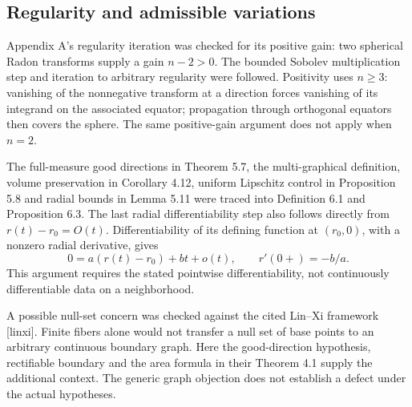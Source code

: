 \documentclass[10pt]{article}
\begin{document}
\subsection*{Regularity and admissible variations}
Appendix A’s regularity iteration was checked for its positive gain: two spherical Radon transforms supply a gain \(n-2>0\). The bounded Sobolev multiplication step and iteration to arbitrary regularity were followed. Positivity uses \(n\geq3\): vanishing of the nonnegative transform at a direction forces vanishing of its integrand on the associated equator; propagation through orthogonal equators then covers the sphere. The same positive-gain argument does not apply when \(n=2\).\par
The full-measure good directions in Theorem 5.7, the multi-graphical definition, volume preservation in Corollary 4.12, uniform Lipschitz control in Proposition 5.8 and radial bounds in Lemma 5.11 were traced into Definition 6.1 and Proposition 6.3. The last radial differentiability step also follows directly from \(r(t)-r_0=O(t)\). Differentiability of its defining function at \((r_0,0)\), with a nonzero radial derivative, gives \[0=a(r(t)-r_0)+bt+o(t),\qquad r'(0+)=-b/a.\] This argument requires the stated pointwise differentiability, not continuously differentiable data on a neighborhood.\par
A possible null-set concern was checked against the cited Lin–Xi framework [linxi]. Finite fibers alone would not transfer a null set of base points to an arbitrary continuous boundary graph. Here the good-direction hypothesis, rectifiable boundary and the area formula in their Theorem 4.1 supply the additional context. The generic graph objection does not establish a defect under the actual hypotheses.\par
\end{document}
